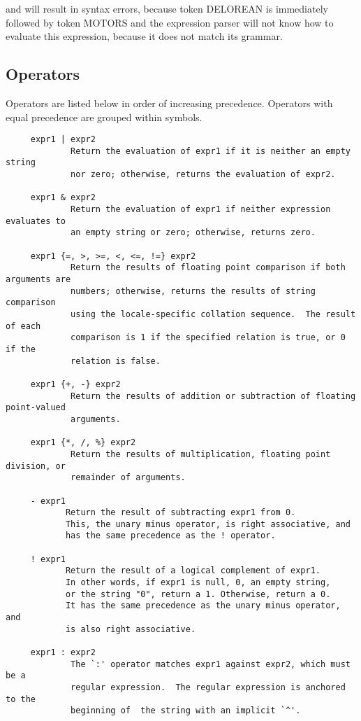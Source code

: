and will result in syntax errors, because token DELOREAN is immediately
followed by token MOTORS and the expression parser will not know how to 
evaluate this expression, because it does not match its grammar.

\subsection{Operators}

Operators are listed below in order of increasing precedence.  Operators
with equal precedence are grouped within { } symbols.

\begin{verbatim}
     expr1 | expr2
             Return the evaluation of expr1 if it is neither an empty string
             nor zero; otherwise, returns the evaluation of expr2.

     expr1 & expr2
             Return the evaluation of expr1 if neither expression evaluates to
             an empty string or zero; otherwise, returns zero.

     expr1 {=, >, >=, <, <=, !=} expr2
             Return the results of floating point comparison if both arguments are
             numbers; otherwise, returns the results of string comparison
             using the locale-specific collation sequence.  The result of each
             comparison is 1 if the specified relation is true, or 0 if the
             relation is false.

     expr1 {+, -} expr2
             Return the results of addition or subtraction of floating point-valued
             arguments.

     expr1 {*, /, %} expr2
             Return the results of multiplication, floating point division, or
             remainder of arguments.

     - expr1
            Return the result of subtracting expr1 from 0.
            This, the unary minus operator, is right associative, and
            has the same precedence as the ! operator.

     ! expr1
            Return the result of a logical complement of expr1.
            In other words, if expr1 is null, 0, an empty string,
            or the string "0", return a 1. Otherwise, return a 0.
            It has the same precedence as the unary minus operator, and
            is also right associative.

     expr1 : expr2
             The `:' operator matches expr1 against expr2, which must be a
             regular expression.  The regular expression is anchored to the
             beginning of  the string with an implicit `^'.


\end{verbatim}
